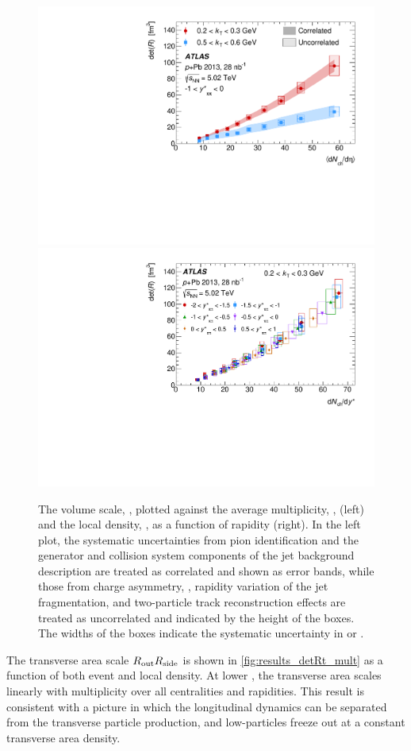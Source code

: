 \begin{figure}[t]
\centering
\includegraphics[width=0.49\linewidth]{canqosl_detR_vs_avg_mult.pdf}
\includegraphics[width=0.49\linewidth]{canqosl_detR_kt1_vs_mult.pdf}
\caption{The volume scale, \detR, plotted against the average multiplicity, \avgdNdeta, (left) and the local density, \dNdy, as a function of rapidity (right). In the left plot, the systematic uncertainties from pion identification and the generator and collision system components of the jet background description are treated as correlated and shown as error bands, while those from charge asymmetry, \Reff, rapidity variation of the jet fragmentation, and two-particle track reconstruction effects are treated as uncorrelated and indicated by the height of the boxes. The widths of the boxes indicate the systematic uncertainty in \avgdNdeta or \dNdy.}
\label{fig:results_detR_dndeta}
\end{figure}

The transverse area scale $R_{\mathrm{out}}R_{\mathrm{side}}$ is shown in \cref{fig:results_detRt_mult} as a function of both event and local density. At lower \kt, the transverse area scales linearly with multiplicity over all centralities and rapidities. This result is consistent with a picture in which the longitudinal dynamics can be separated from the transverse particle production, and low-\kt particles freeze out at a constant transverse area density.


